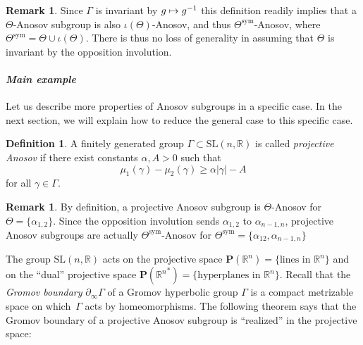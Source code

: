 \documentclass[JEP,XML,SOM,Unicode,NoEqCountersInSection,NoFloatCountersInSection,published]{cedram}
\newcommand{\sym}{\mathrm{sym}}
\newcommand\mto{\mathchoice{\longmapsto}{\mapsto}{\mapsto}{\mapsto}}
\theoremstyle{definition}
\newtheorem{defi}[theo]{Definition}
\newtheorem{rmk}[theo]{Remark}
\newcommand{\proj}{\mathbf{P}}
\newcommand{\R}{\mathbb{R}}
\newcommand{\SL}{\mathrm{SL}}
\let\op\iota
\let\G\Gamma
\let\g\gamma
\begin{document}
\begin{rmk}
Since $\Gamma$ is invariant by $g\mto g^{-1}$ this definition readily implies that a $\Theta$-Anosov subgroup is also $\op(\Theta)$-Anosov, and thus $\Theta^{\sym}$-Anosov, where $\Theta^{\sym} = \Theta \cup \op(\Theta)$. There is thus no loss of generality in assuming that $\Theta$ is invariant by the opposition involution.
\end{rmk}

\paragraph{{\it Main example}}

Let us describe more properties of Anosov subgroups in a specific case. In the next section, we will explain how to reduce the general case to this specific case.
\begin{defi}
A finitely generated group $\G \subset \SL(n,\R)$ is called \emph{projective Anosov} if there exist constants $\alpha, A>0$ such that\vspace*{-3pt}
\[\mu_1(\g) - \mu_2(\g) \geq \alpha \vert \g \vert - A\]
for all $\g\in \G$.
\end{defi}

\begin{rmk}
By definition, a projective Anosov subgroup is $\Theta$-Anosov for $\Theta =\{\alpha_{1,2}\}$. Since the opposition involution sends $\alpha_{1,2}$ to $\alpha_{n-1, n}$, projective Anosov subgroups are actually $\Theta^{\sym}$-Anosov for $\Theta^{\sym} =\{\alpha_{12}, \alpha_{n-1,n}\}$
\end{rmk}

The group $\SL(n,\R)$ acts on the projective space $\proj(\R^n) = \{\textrm{lines in }\R^n\}$ and on the ``dual'' projective space $\proj({\R^n}^*)= \{\textrm{hyperplanes in }\R^n\}$. Recall that the \emph{Gromov boundary} $\partial_\infty \G$ of a Gromov hyperbolic group $\G$ is a compact metrizable space on which~$\G$ acts by homeomorphisms. The following theorem says that the Gromov boundary of a projective Anosov subgroup is ``realized'' in the projective space:
\end{document}
